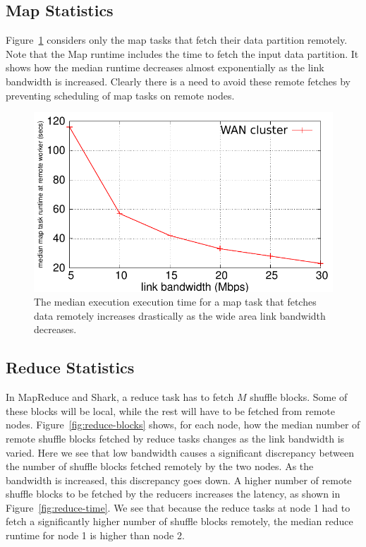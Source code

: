 \subsection{Map Statistics}

Figure~\ref{fig:map-time} considers only the map tasks that fetch their data partition remotely. Note that the Map runtime includes the time to fetch the input data partition. It shows how the median runtime decreases almost exponentially as the link bandwidth is increased. Clearly there is a need to avoid these remote fetches
by preventing scheduling of map tasks on remote nodes. 

\begin{figure}[!ht]
\centering\includegraphics[width=\columnwidth]{figs/map-time.pdf}
\vspace{-1.2em}
\caption{The median execution execution time for a map task that fetches data remotely increases drastically as the wide area link bandwidth decreases.}
\label{fig:map-time}
\vspace{.7em}
\end{figure}

\subsection{Reduce Statistics}

In MapReduce and Shark, a reduce task has to fetch $M$ shuffle blocks. Some of these blocks will be local, while the rest will have to be fetched from remote nodes.  Figure~\ref{fig:reduce-blocks} shows, for each node, how the median number of remote shuffle blocks fetched by reduce tasks changes as the link bandwidth is varied. Here we see that low bandwidth causes a significant discrepancy between the number of shuffle blocks fetched remotely by the two nodes. As the bandwidth is increased, this discrepancy goes down. A higher number of remote shuffle blocks to be fetched by the reducers increases the latency, as shown in Figure~\ref{fig:reduce-time}. We see that because the reduce tasks at node 1 had to fetch a significantly higher number of shuffle blocks remotely, the median reduce runtime for node 1 is higher than node 2.   



